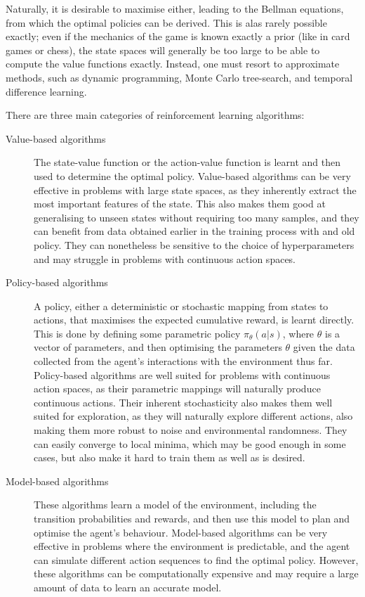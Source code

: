 Naturally, it is desirable to maximise either, leading to the Bellman equations, from which the optimal policies can be derived.
This is alas rarely possible exactly; even if the mechanics of the game is known exactly a prior (like in card games or chess), the state spaces will generally be too large to be able to compute the value functions exactly.
Instead, one must resort to approximate methods, such as dynamic programming, Monte Carlo tree-search, and temporal difference learning.

There are three main categories of reinforcement learning algorithms:
\begin{description}
    \item[Value-based algorithms]
        The state-value function or the action-value function is learnt and then used  to determine the optimal policy.
        Value-based algorithms can be very effective in problems with large state spaces, as they inherently extract the most important features of the state.
        This also makes them good at generalising to unseen states without requiring too many samples, and they can benefit from data obtained earlier in the training process with and old policy.
        They can nonetheless be sensitive to the choice of hyperparameters and may struggle in problems with continuous action spaces.


    \item[Policy-based algorithms]
        A policy, either a deterministic or stochastic mapping from states to actions, that maximises the expected cumulative reward, is learnt directly.
        This is done by defining some parametric policy $\pi_\theta(a | s)$, where $\theta$ is a vector of parameters, and then optimising the parameters $\theta$ given the data collected from the agent's interactions with the environment thus far.
        Policy-based algorithms are well suited for problems with continuous action spaces, as their parametric mappings will naturally produce continuous actions.
        Their inherent stochasticity also makes them well suited for exploration, as they will naturally explore different actions, also making them more robust to noise and environmental randomness.
        They can easily converge to local minima, which may be good enough in some cases, but also make it hard to train them as well as is desired.

    \item[Model-based algorithms]
        These algorithms learn a model of the environment, including the transition probabilities and rewards, and then use this model to plan and optimise the agent's behaviour.
        Model-based algorithms can be very effective in problems where the environment is predictable, and the agent can simulate different action sequences to find the optimal policy.
        However, these algorithms can be computationally expensive and may require a large amount of data to learn an accurate model.

\end{description}

